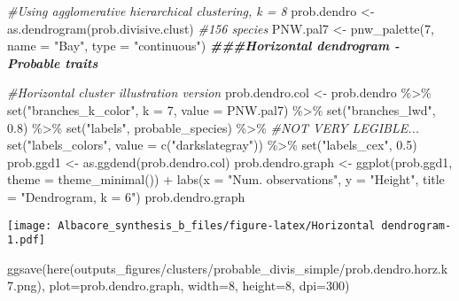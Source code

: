 \documentclass[
]{article}
\newenvironment{Shaded}{\begin{snugshade}}{\end{snugshade}}
\newcommand{\AttributeTok}[1]{\textcolor[rgb]{0.77,0.63,0.00}{#1}}
\newcommand{\CommentTok}[1]{\textcolor[rgb]{0.56,0.35,0.01}{\textit{#1}}}
\newcommand{\DecValTok}[1]{\textcolor[rgb]{0.00,0.00,0.81}{#1}}
\newcommand{\DocumentationTok}[1]{\textcolor[rgb]{0.56,0.35,0.01}{\textbf{\textit{#1}}}}
\newcommand{\FloatTok}[1]{\textcolor[rgb]{0.00,0.00,0.81}{#1}}
\newcommand{\FunctionTok}[1]{\textcolor[rgb]{0.00,0.00,0.00}{#1}}
\newcommand{\NormalTok}[1]{#1}
\newcommand{\OtherTok}[1]{\textcolor[rgb]{0.56,0.35,0.01}{#1}}
\newcommand{\SpecialCharTok}[1]{\textcolor[rgb]{0.00,0.00,0.00}{#1}}
\newcommand{\StringTok}[1]{\textcolor[rgb]{0.31,0.60,0.02}{#1}}
\begin{document}
\begin{Shaded}
\begin{Highlighting}[]
\CommentTok{\#Using agglomerative hierarchical clustering, k = 8}
\NormalTok{prob.dendro }\OtherTok{\textless{}{-}} \FunctionTok{as.dendrogram}\NormalTok{(prob.divisive.clust) }\CommentTok{\#156 species}
\NormalTok{PNW.pal7 }\OtherTok{\textless{}{-}} \FunctionTok{pnw\_palette}\NormalTok{(}\DecValTok{7}\NormalTok{, }\AttributeTok{name =} \StringTok{"Bay"}\NormalTok{, }\AttributeTok{type =} \StringTok{"continuous"}\NormalTok{)}
\DocumentationTok{\#\#\#Horizontal dendrogram {-} Probable traits}

\CommentTok{\#Horizontal cluster illustration version}
\NormalTok{prob.dendro.col }\OtherTok{\textless{}{-}}\NormalTok{ prob.dendro }\SpecialCharTok{\%\textgreater{}\%}
  \FunctionTok{set}\NormalTok{(}\StringTok{"branches\_k\_color"}\NormalTok{, }\AttributeTok{k =} \DecValTok{7}\NormalTok{, }\AttributeTok{value =}\NormalTok{ PNW.pal7) }\SpecialCharTok{\%\textgreater{}\%}
  \FunctionTok{set}\NormalTok{(}\StringTok{"branches\_lwd"}\NormalTok{, }\FloatTok{0.8}\NormalTok{) }\SpecialCharTok{\%\textgreater{}\%}
  \FunctionTok{set}\NormalTok{(}\StringTok{"labels"}\NormalTok{, probable\_species) }\SpecialCharTok{\%\textgreater{}\%} \CommentTok{\#NOT VERY LEGIBLE...}
  \FunctionTok{set}\NormalTok{(}\StringTok{"labels\_colors"}\NormalTok{, }
      \AttributeTok{value =} \FunctionTok{c}\NormalTok{(}\StringTok{"darkslategray"}\NormalTok{)) }\SpecialCharTok{\%\textgreater{}\%} 
  \FunctionTok{set}\NormalTok{(}\StringTok{"labels\_cex"}\NormalTok{, }\FloatTok{0.5}\NormalTok{)}
\NormalTok{prob.ggd1 }\OtherTok{\textless{}{-}} \FunctionTok{as.ggdend}\NormalTok{(prob.dendro.col)}
\NormalTok{prob.dendro.graph }\OtherTok{\textless{}{-}} \FunctionTok{ggplot}\NormalTok{(prob.ggd1, }\AttributeTok{theme =} \FunctionTok{theme\_minimal}\NormalTok{()) }\SpecialCharTok{+}
  \FunctionTok{labs}\NormalTok{(}\AttributeTok{x =} \StringTok{"Num. observations"}\NormalTok{, }\AttributeTok{y =} \StringTok{"Height"}\NormalTok{, }\AttributeTok{title =} \StringTok{"Dendrogram, k = 6"}\NormalTok{)}
\NormalTok{prob.dendro.graph}
\end{Highlighting}
\end{Shaded}

\texttt{[image: Albacore\_synthesis\_b\_files/figure-latex/Horizontal dendrogram-1.pdf]}

\begin{Shaded}
\begin{Highlighting}[]
\FunctionTok{ggsave}\NormalTok{(}\FunctionTok{here}\NormalTok{(}\StringTok{\textquotesingle{}outputs\_figures/clusters/probable\_divis\_simple/prob.dendro.horz.k7.png\textquotesingle{}}\NormalTok{), }\AttributeTok{plot=}\NormalTok{prob.dendro.graph, }\AttributeTok{width=}\DecValTok{8}\NormalTok{, }\AttributeTok{height=}\DecValTok{8}\NormalTok{, }\AttributeTok{dpi=}\DecValTok{300}\NormalTok{)}
\end{Highlighting}
\end{Shaded}
\end{document}
